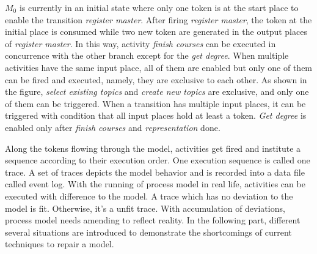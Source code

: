 $M_0$ is currently in an initial state where only one token is at the start place to enable the transition \emph{register master}. After firing \emph{register master}, the token at the initial place is consumed while two new token are generated in the output places of \emph{register master}. In this way, activity \emph{finish courses}  can be executed in concurrence with the other branch except for the \emph{get degree}. When multiple activities have the same input place, all of them are enabled but only one of them can be fired and executed, namely, they are exclusive to each other. As shown in the figure,  \emph{select existing topics}  and \emph{create new topics} are exclusive, and only one of them can be triggered. When a transition has multiple input places, it can be triggered with condition that all input places hold at least a token. \emph{Get degree} is enabled only after \emph{finish courses} and \emph{representation} done. 


Along the tokens flowing through the model, activities get fired and institute a sequence according to their execution order. One execution sequence is called one trace. A set of traces depicts the model behavior and is recorded into a data file called event log. With the running of process model in real life, activities can be executed with difference to the model. A trace which has no deviation to the model is fit. Otherwise, it's a unfit trace. With accumulation of deviations, process model needs amending to reflect reality.  In the following part, different several situations are introduced to demonstrate the shortcomings of current techniques to repair a model. 
